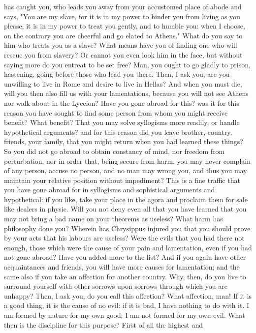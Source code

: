 \documentclass[a4paper]{article}
\begin{document}
has caught you, who leads you away from your accustomed place of abode and
says, "You are my slave, for it is in my power to hinder you from living as you
please, it is in my power to treat you gently, and to humble you: when I
choose, on the contrary you are cheerful and go elated to Athens." What do you
say to him who treats you as a slave? What means have you of finding one who
will rescue you from slavery? Or cannot you even look him in the face, but
without saying more do you entreat to be set free? Man, you ought to go gladly
to prison, hastening, going before those who lead you there. Then, I ask you,
are you unwilling to live in Rome and desire to live in Hellas? And when you
must die, will you then also fill us with your lamentations, because you will
not see Athens nor walk about in the Lyceion? Have you gone abroad for this?
was it for this reason you have sought to find some person from whom you might
receive benefit? What benefit? That you may solve syllogisms more readily, or
handle hypothetical arguments? and for this reason did you leave brother,
country, friends, your family, that you might return when you had learned these
things? So you did not go abroad to obtain constancy of mind, nor freedom from
perturbation, nor in order that, being secure from harm, you may never complain
of any person, accuse no person, and no man may wrong you, and thus you may
maintain your relative position without impediment? This is a fine traffic that
you have gone abroad for in syllogisms and sophistical arguments and
hypothetical: if you like, take your place in the agora and proclaim them for
sale like dealers in physic. Will you not deny even all that you have learned
that you may not bring a bad name on your theorems as useless? What harm has
philosophy done you? Wherein has Chrysippus injured you that you should prove
by your acts that his labours are useless? Were the evils that you had there
not enough, those which were the cause of your pain and lamentation, even if
you had not gone abroad? Have you added more to the list? And if you again have
other acquaintances and friends, you will have more causes for lamentation; and
the same also if you take an affection for another country. Why, then, do you
live to surround yourself with other sorrows upon sorrows through which you are
unhappy? Then, I ask you, do you call this affection? What affection, man! If
it is a good thing, it is the cause of no evil: if it is bad, I have nothing to
do with it. I am formed by nature for my own good: I am not formed for my own
evil.
    What then is the discipline for this purpose? First of all the highest and
\end{document}
